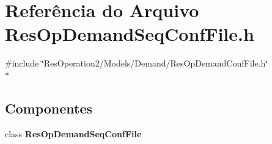 \section{Referência do Arquivo Res\+Op\+Demand\+Seq\+Conf\+File.\+h}
\label{_res_op_demand_seq_conf_file_8h}
{\ttfamily \#include \char`\"{}Res\+Operation2/\+Models/\+Demand/\+Res\+Op\+Demand\+Conf\+File.\+h\char`\"{}}\\*
\subsection*{Componentes}
\begin{DoxyCompactItemize}
\item 
class {\bf Res\+Op\+Demand\+Seq\+Conf\+File}
\end{DoxyCompactItemize}
